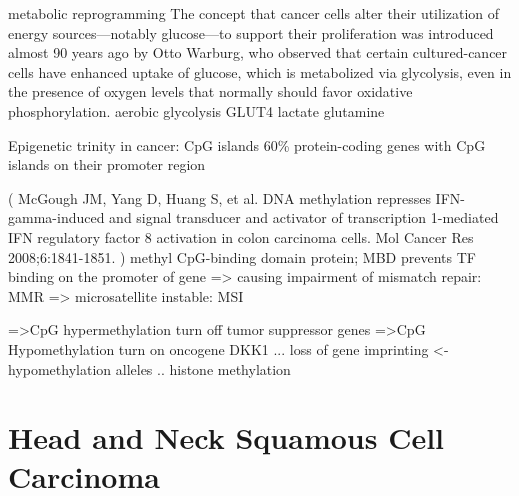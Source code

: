 \documentclass[12pt, a4paper]{article}
\begin{document}
metabolic reprogramming
The concept that cancer cells alter their utilization of energy sources—notably glucose—to support their proliferation was introduced almost 90 years ago by Otto Warburg, who observed that certain cultured-cancer cells have enhanced uptake of glucose, which is metabolized via glycolysis, even in the presence of oxygen levels that normally should favor oxidative phosphorylation.
aerobic glycolysis
GLUT4 \citep{Chang2017b}
lactate
glutamine


Epigenetic trinity in cancer: CpG islands
60\% protein-coding genes with CpG islands on their promoter region

(
McGough JM, Yang D, Huang S, et al. DNA methylation represses IFN-gamma-induced and signal transducer and activator of transcription 1-mediated IFN regulatory factor 8 activation in colon carcinoma cells. Mol Cancer Res 2008;6:1841-1851.
)
methyl CpG-binding domain protein; MBD prevents TF binding on the promoter of gene
=> causing impairment of mismatch repair: MMR => microsatellite instable: MSI

=>CpG hypermethylation
turn off tumor suppressor genes
=>CpG Hypomethylation turn on oncogene
DKK1
...
loss of gene imprinting <- hypomethylation
alleles 
..
histone methylation






\section*{Head and Neck Squamous Cell Carcinoma}
\label{sec:section}
\end{document}
